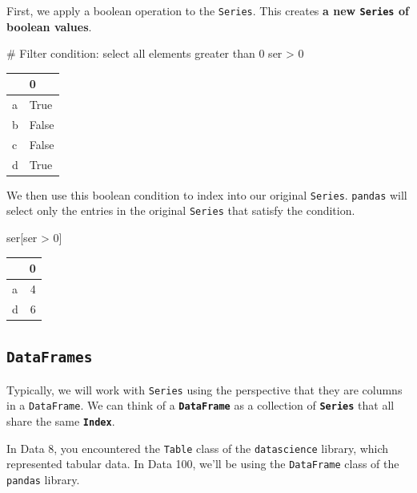 \documentclass[
  letterpaper,
  DIV=11,
  numbers=noendperiod]{scrreprt}
\newenvironment{Shaded}{\begin{snugshade}}{\end{snugshade}}
\newcommand{\CommentTok}[1]{\textcolor[rgb]{0.37,0.37,0.37}{#1}}
\newcommand{\DecValTok}[1]{\textcolor[rgb]{0.68,0.00,0.00}{#1}}
\newcommand{\NormalTok}[1]{\textcolor[rgb]{0.00,0.23,0.31}{#1}}
\newcommand{\OperatorTok}[1]{\textcolor[rgb]{0.37,0.37,0.37}{#1}}
\begin{document}
First, we apply a boolean operation to the \texttt{Series}. This creates
\textbf{a new \texttt{Series} of boolean values}.

\begin{Shaded}
\begin{Highlighting}[]
\CommentTok{\# Filter condition: select all elements greater than 0}
\NormalTok{ser }\OperatorTok{\textgreater{}} \DecValTok{0} 
\end{Highlighting}
\end{Shaded}

\begin{tabular}{ll}
\toprule
{} &      0 \\
\midrule
a &   True \\
b &  False \\
c &  False \\
d &   True \\
\bottomrule
\end{tabular}

We then use this boolean condition to index into our original
\texttt{Series}. \texttt{pandas} will select only the entries in the
original \texttt{Series} that satisfy the condition.

\begin{Shaded}
\begin{Highlighting}[]
\NormalTok{ser[ser }\OperatorTok{\textgreater{}} \DecValTok{0}\NormalTok{] }
\end{Highlighting}
\end{Shaded}

\begin{tabular}{lr}
\toprule
{} &  0 \\
\midrule
a &  4 \\
d &  6 \\
\bottomrule
\end{tabular}

\hypertarget{dataframes}{%
\subsection{\texorpdfstring{\texttt{DataFrames}}{DataFrames}}\label{dataframes}}

Typically, we will work with \texttt{Series} using the perspective that
they are columns in a \texttt{DataFrame}. We can think of a
\textbf{\texttt{DataFrame}} as a collection of \textbf{\texttt{Series}}
that all share the same \textbf{\texttt{Index}}.

In Data 8, you encountered the \texttt{Table} class of the
\texttt{datascience} library, which represented tabular data. In Data
100, we'll be using the \texttt{DataFrame} class of the \texttt{pandas}
library.
\end{document}
